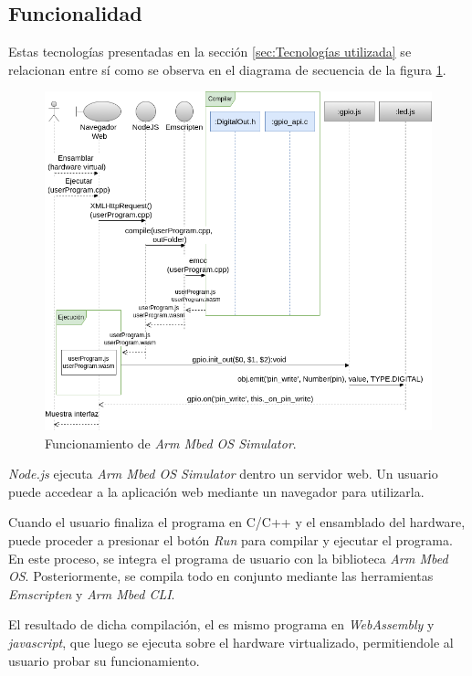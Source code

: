 \subsection{Funcionalidad}

Estas tecnologías presentadas en la sección \ref{sec:Tecnologías utilizada} se relacionan entre sí como se observa en el diagrama de secuencia de la figura \ref{fig:DiagramaSecuenciaMBED}.

\begin{figure}[ht]
	\centering
	\includegraphics[scale=.49]{./Figures/DiagramaSecuenciaMBED.png}
	\caption{Funcionamiento de \textit{Arm Mbed OS Simulator}.}
	\label{fig:DiagramaSecuenciaMBED}
\end{figure}

\textit{Node.js} ejecuta \textit{Arm Mbed OS Simulator} dentro un servidor web. Un usuario puede accedear a la aplicación web mediante un navegador para utilizarla. 

Cuando el usuario finaliza el programa en C/C++ y el ensamblado del hardware, puede proceder a presionar el botón \textit{Run} para compilar y ejecutar el programa. En este proceso, se integra el programa de usuario con la biblioteca \textit{Arm Mbed OS}. Posteriormente, se compila todo en conjunto mediante las herramientas \textit{Emscripten} y \textit{Arm Mbed CLI}.

El resultado de dicha compilación, el es mismo programa en \textit{WebAssembly} y \textit{javascript}, que luego se ejecuta sobre el hardware virtualizado, permitiendole al usuario probar su funcionamiento.



